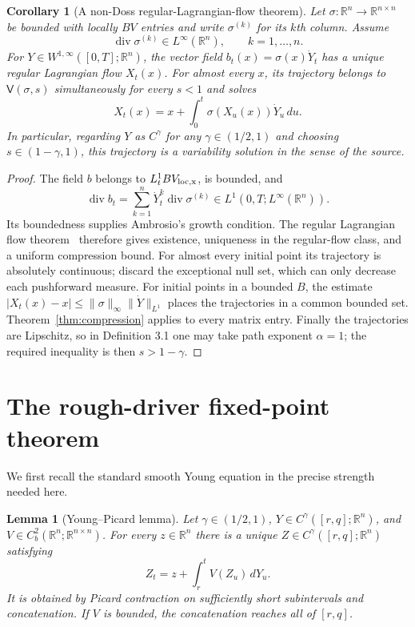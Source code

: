 \documentclass[11pt]{article}
\newtheorem{lemma}{Lemma}
\newtheorem{corollary}{Corollary}
\newcommand{\R}{\mathbb{R}}
\newcommand{\V}{\mathsf{V}}
\begin{document}
\begin{corollary}[A non-Doss regular-Lagrangian-flow theorem]
\label{cor:ambrosio}
Let $\sigma:\R^n\to\R^{n\times n}$ be bounded with locally $BV$ entries and
write $\sigma^{(k)}$ for its $k$th column.  Assume
\[
 \operatorname{div}\sigma^{(k)}\in L^\infty(\R^n),
 \qquad k=1,\ldots,n.
\]
For $Y\in W^{1,\infty}([0,T];\R^n)$, the vector field
$b_t(x)=\sigma(x)\dot Y_t$ has a unique regular Lagrangian flow $X_t(x)$.
For almost every $x$, its trajectory belongs to
$\V(\sigma,s)$ simultaneously for every $s<1$ and solves
\[
 X_t(x)=x+\int_0^t\sigma(X_u(x))\dot Y_u\,du.
\]
In particular, regarding $Y$ as $C^\gamma$ for any
$\gamma\in(1/2,1)$ and choosing $s\in(1-\gamma,1)$, this trajectory is a
variability solution in the sense of the source.
\end{corollary}

\begin{proof}
The field $b$ belongs to $L^1_tBV_{\rm loc,x}$, is bounded, and
\[
 \operatorname{div}b_t
 =\sum_{k=1}^n\dot Y_t^k\operatorname{div}\sigma^{(k)}
 \in L^1(0,T;L^\infty(\R^n)).
\]
Its boundedness supplies Ambrosio's growth condition.  The regular
Lagrangian flow theorem~\cite{Ambrosio,AmbrosioOverview} therefore gives existence,
uniqueness in the regular-flow class, and a uniform compression bound.  For
almost every initial point its trajectory is absolutely continuous; discard
the exceptional null set, which can only decrease each pushforward measure.
For
initial points in a bounded $B$, the estimate
$|X_t(x)-x|\leq\|\sigma\|_\infty\|\dot Y\|_{L^1}$ places the trajectories
in a common bounded set.  Theorem~\ref{thm:compression} applies to every
matrix entry.  Finally the trajectories are Lipschitz, so in Definition 3.1
one may take path exponent $\alpha=1$; the required inequality is then
$s>1-\gamma$.
\end{proof}

\section{The rough-driver fixed-point theorem}

We first recall the standard smooth Young equation in the precise strength
needed here.

\begin{lemma}[Young--Picard lemma]\label{lem:young-picard}
Let $\gamma\in(1/2,1)$, $Y\in C^\gamma([r,q];\R^n)$, and
$V\in C_b^2(\R^n;\R^{n\times n})$.  For every $z\in\R^n$ there is a unique
$Z\in C^\gamma([r,q];\R^n)$ satisfying
\[
 Z_t=z+\int_r^t V(Z_u)\,dY_u.
\]
It is obtained by Picard contraction on sufficiently short subintervals and
concatenation.  If $V$ is bounded, the concatenation reaches all of $[r,q]$.
\end{lemma}
\end{document}
